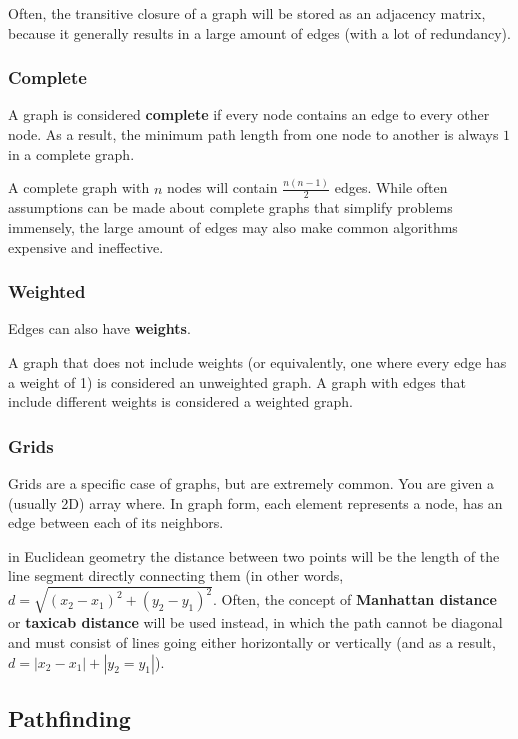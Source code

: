 Often, the transitive closure of a graph will be stored as an adjacency matrix, because it generally results in a large amount of edges (with a lot of redundancy).

\subsubsection{Complete}

A graph is considered \textbf{complete} if every node contains an edge to every other node. As a result, the minimum path length from one node to another is always $1$ in a complete graph.

A complete graph with $n$ nodes will contain $\frac{n(n-1)}{2}$ edges. While often assumptions can be made about complete graphs that simplify problems immensely, the large amount of edges may also make common algorithms expensive and ineffective.

\subsubsection{Weighted}
 

Edges can also have \textbf{weights}.

A graph that does not include weights (or equivalently, one where every edge has a weight of 1) is considered an unweighted graph. A graph with edges that include different weights is considered a weighted graph.

\subsubsection{Grids}

Grids are a specific case of graphs, but are extremely common. You are given a (usually 2D) array where. In graph form, each element represents a node, has an edge between each of its neighbors. 

in Euclidean geometry the distance between two points will be the length of the line segment directly connecting them (in other words, $d = \sqrt{(x_2 - x_1)^2 + (y_2 - y_1)^2}$. Often, the concept of \textbf{Manhattan distance} or \textbf{taxicab distance} will be used instead, in which the path cannot be diagonal and must consist of lines going either horizontally or vertically (and as a result, $d = |x_2 - x_1| + |y_2 = y_1|$).

\subsection{Pathfinding}

